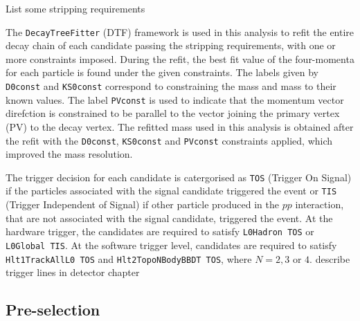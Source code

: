 {\color{red}List some stripping requirements}

The {\tt DecayTreeFitter} (DTF) framework is used in this analysis to refit the entire decay chain of each \B candidate passing the stripping requirements, with one or more constraints imposed. During the refit, the best fit value of the four-momenta for each particle is found under the given constraints. The labels given by {\tt D0const} and {\tt KS0const} correspond to constraining the \D mass and \KS mass to their known values. The label {\tt PVconst} is used to indicate that the \B momentum vector direfction is constrained to be parallel to the vector joining the primary vertex (PV) to the \B decay vertex. The refitted \B mass used in this analysis is obtained after the refit with the {\tt D0const}, {\tt KS0const} and {\tt PVconst} constraints applied, which improved the \B mass resolution.

The trigger decision for each candidate is catergorised as {\tt TOS} (Trigger On Signal) if the particles associated with the signal candidate triggered the event or {\tt TIS} (Trigger Independent of Signal) if other particle produced in the $pp$ interaction, that are not associated with the signal candidate, triggered the event. At the hardware trigger, the \B candidates are required to satisfy {\tt L0Hadron TOS} or {\tt L0Global TIS}. At the software trigger level, \B candidates are required to satisfy {\tt Hlt1TrackAllL0 TOS} and {\tt Hlt2TopoNBodyBBDT TOS}, where $N = 2,3 \text{ or } 4$. {\color{red}describe trigger lines in detector chapter}


%

\subsection{Pre-selection}
\label{sec:selection:pre-selection}

